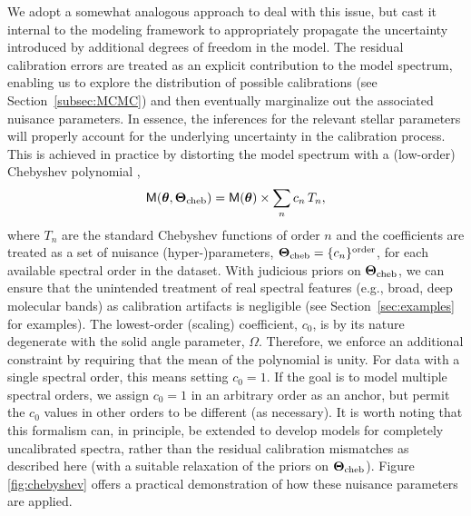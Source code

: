 \documentclass[iop,floatfix]{emulateapj}
\newcommand{\vt}{ {\bm \theta}}
\newcommand{\vT}{ {\bm \Theta}}
\newcommand{\vM}{\mathsf{M}}
\begin{document}
We adopt a somewhat analogous approach to deal with this issue, but cast it internal to the 
modeling framework to appropriately propagate the uncertainty introduced by additional degrees of 
freedom in the model.  The residual calibration errors are treated as an explicit contribution to 
the model spectrum, enabling us to explore the distribution of possible calibrations (see 
Section~\ref{subsec:MCMC}) and then eventually marginalize out the associated nuisance parameters.  
In essence, the inferences for the relevant stellar parameters will properly account for the 
underlying uncertainty in the calibration process.  This is achieved in practice by distorting the 
model spectrum with a (low-order) Chebyshev polynomial \citep[e.g.,][]{eisenstein06,koleva09}, 
\begin{equation}
\vM(\vt, \vT_{\rm cheb}) = \vM(\vt) \times \sum_n c_n \, T_n,
\end{equation}
where $T_n$ are the standard Chebyshev functions of order $n$ and the coefficients are treated as a
set of nuisance (hyper-)parameters, $\vT_{\rm cheb} = \{c_n\}^{\rm order}$, for each available 
spectral order in the dataset.  With judicious priors on $\vT_{\rm cheb}$, we can ensure that the 
unintended treatment of real spectral features (e.g., broad, deep molecular bands) as calibration 
artifacts is negligible (see Section~\ref{sec:examples} for examples).  The lowest-order (scaling) 
coefficient, $c_0$, is by its nature degenerate with the solid angle parameter, $\Omega$.  
Therefore, we enforce an additional constraint by requiring that the mean of the polynomial is 
unity.  For data with a single spectral order, this means setting $c_0 = 1$.  If the goal is to 
model multiple spectral orders, we assign $c_0 = 1$ in an arbitrary order as an anchor, but permit 
the $c_0$ values in other orders to be different (as necessary).  It is worth noting that this 
formalism can, in principle, be extended to develop models for completely uncalibrated spectra, 
rather than the residual calibration mismatches as described here (with a suitable relaxation of 
the priors on $\vT_{\rm cheb}$).  Figure \ref{fig:chebyshev} offers a practical demonstration of how 
these nuisance parameters are applied. 
\end{document}
